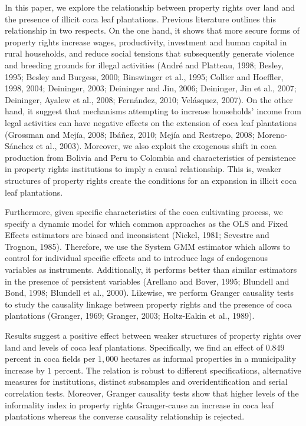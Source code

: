 \documentclass[12pt,a4paper,english]{article}%
\begin{document}
In this paper, we explore the relationship between property rights over land and the presence of illicit coca leaf plantations. Previous literature outlines this relationship in two respects. On the one hand, it shows that more secure forms of property rights increase wages, productivity, investment and human capital in rural households, and reduce social tensions that subsequently generate violence and breeding grounds for illegal activities (Andr\'{e} and Platteau, 1998; Besley, 1995; Besley and Burgess, 2000; Binswinger et al., 1995; Collier and Hoeffler, 1998, 2004; Deininger, 2003; Deininger and Jin, 2006; Deininger, Jin et al., 2007; Deininger, Ayalew et al., 2008; Fern\'{a}ndez, 2010; Vel\'{a}squez, 2007). On the other hand, it suggest that mechanisms attempting to increase households' income from legal activities can have negative effects on the extension of coca leaf plantations (Grossman and Mej\'{i}a, 2008; Ib\'{a}\~{n}ez, 2010; Mej\'{i}a and Restrepo, 2008; Moreno-S\'{a}nchez et al., 2003). Moreover, we also exploit the exogenous shift in coca production from Bolivia and Peru to Colombia and characteristics of persistence in property rights institutions to imply a causal relationship. This is, weaker structures of property rights create the conditions for an expansion in illicit coca leaf plantations.

Furthermore, given specific characteristics of the coca cultivating process, we specify a dynamic model for which common approaches as the OLS and Fixed Effects estimators are biased and inconsistent (Nickel, 1981; Sevestre and Trognon, 1985). Therefore, we use the System GMM estimator which allows to control for individual specific effects and to introduce lags of endogenous variables as instruments. Additionally, it performs better than similar estimators in the presence of persistent variables (Arellano and Bover, 1995; Blundell and Bond, 1998; Blundell et al., 2000). Likewise, we perform Granger causality tests to study the causality linkage between property rights and the presence of coca plantations (Granger, 1969; Granger, 2003; Holtz-Eakin et al., 1989).

Results suggest a positive effect between weaker structures of property rights over land and levels of coca leaf plantations. Specifically, we find an effect of $0.849$ percent in coca fields per $1,000$ hectares as informal properties in a municipality increase by $1$ percent. The relation is robust to different specifications, alternative measures for institutions, distinct subsamples and overidentification and serial correlation tests. Moreover, Granger causality tests show that higher levels of the informality index in property rights Granger-cause an increase in coca leaf plantations whereas the converse causality relationship is rejected.
\end{document}
